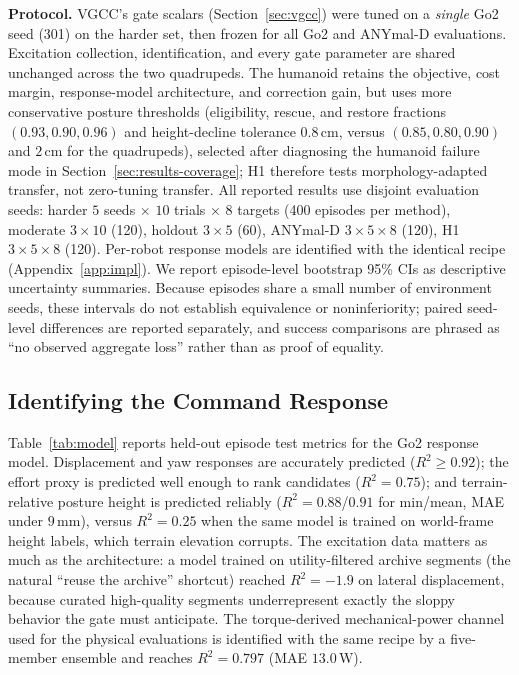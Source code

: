 \documentclass{article}
\begin{document}
\textbf{Protocol.}
VGCC's gate scalars (Section~\ref{sec:vgcc}) were tuned on a \emph{single} Go2 seed
(301) on the harder set, then frozen for all Go2 and ANYmal-D evaluations.
Excitation collection, identification, and every gate parameter are shared
unchanged across the two quadrupeds. The humanoid retains the objective, cost
margin, response-model architecture, and correction gain, but uses more
conservative posture thresholds (eligibility, rescue, and restore fractions
$(0.93,0.90,0.96)$ and height-decline tolerance $0.8$\,cm, versus
$(0.85,0.80,0.90)$ and $2$\,cm for the quadrupeds), selected after diagnosing the
humanoid failure mode in Section~\ref{sec:results-coverage}; H1 therefore tests
morphology-adapted transfer, not zero-tuning transfer.
All reported results use disjoint evaluation seeds: harder $5$ seeds $\times$ $10$
trials $\times$ $8$ targets (400 episodes per method), moderate $3\times10$ (120),
holdout $3\times5$ (60), ANYmal-D $3\times5\times8$ (120), H1 $3\times5\times8$
(120). Per-robot response models are identified with the identical recipe
(Appendix~\ref{app:impl}).
We report episode-level bootstrap 95\% CIs as descriptive uncertainty summaries.
Because episodes share a small number of environment seeds, these intervals do not
establish equivalence or noninferiority; paired seed-level differences are
reported separately, and success comparisons are phrased as ``no observed
aggregate loss'' rather than as proof of equality.

\subsection{Identifying the Command Response}
\label{sec:results-model}

Table~\ref{tab:model} reports held-out episode test metrics for the Go2 response
model.
Displacement and yaw responses are accurately predicted ($R^2 \ge 0.92$); the
effort proxy is predicted well enough to rank candidates ($R^2 = 0.75$); and
terrain-relative posture height is predicted reliably ($R^2 = 0.88$/$0.91$ for
min/mean, MAE under $9$\,mm), versus $R^2 = 0.25$ when the same model is trained on
world-frame height labels, which terrain elevation corrupts.
The excitation data matters as much as the architecture: a model trained on
utility-filtered archive segments (the natural ``reuse the archive'' shortcut)
reached $R^2 = -1.9$ on lateral displacement, because curated high-quality
segments underrepresent exactly the sloppy behavior the gate must anticipate.
The torque-derived mechanical-power channel used for the physical evaluations is
identified with the same recipe by a five-member ensemble and reaches
$R^2 = 0.797$ (MAE $13.0$\,W).
\end{document}
